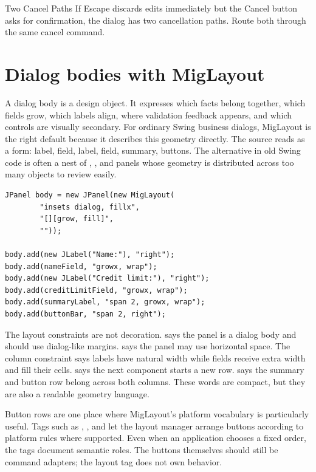 \begin{pitfallbox}{Two Cancel Paths}
If Escape discards edits immediately but the Cancel button asks for
confirmation, the dialog has two cancellation paths. Route both through the same
cancel command.
\end{pitfallbox}

\section{Dialog bodies with MigLayout}

A dialog body is a design object. It expresses which facts belong together,
which fields grow, which labels align, where validation feedback appears, and
which controls are visually secondary. For ordinary Swing business dialogs,
MigLayout is the right default because it describes this geometry directly.
The source reads as a form: label, field, label, field, summary, buttons. The
alternative in old Swing code is often a nest of ,
, and  panels whose geometry is distributed
across too many objects to review easily.

\begin{lstlisting}[caption={Typical MigLayout form body.}]
JPanel body = new JPanel(new MigLayout(
        "insets dialog, fillx",
        "[][grow, fill]",
        ""));

body.add(new JLabel("Name:"), "right");
body.add(nameField, "growx, wrap");
body.add(new JLabel("Credit limit:"), "right");
body.add(creditLimitField, "growx, wrap");
body.add(summaryLabel, "span 2, growx, wrap");
body.add(buttonBar, "span 2, right");
\end{lstlisting}

The layout constraints are not decoration.  says the panel
is a dialog body and should use dialog-like margins.  says the panel
may use horizontal space. The column constraint  says
labels have natural width while fields receive extra width and fill their
cells.  says the next component starts a new row.  says
the summary and button row belong across both columns. These words are compact,
but they are also a readable geometry language.

Button rows are one place where MigLayout's platform vocabulary is particularly
useful. Tags such as , , and  let the
layout manager arrange buttons according to platform rules where supported.
Even when an application chooses a fixed order, the tags document semantic
roles. The buttons themselves should still be command adapters; the layout tag
does not own behavior.

